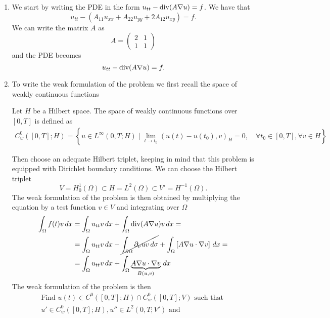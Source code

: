 \begin{enumerate}
    \item We start by writing the PDE in the form \(u_{tt} - \text{div}(A \nabla u) = f\). We have that
    \[
        u_{tt} - \left(A_{11} u_{xx} + A_{22} u_{yy} + 2A_{12} u_{xy}\right) = f.
    \]
    We can write the matrix \(A\) as
    \[
        A = \begin{pmatrix}
            2 & 1 \\
            1 & 1
        \end{pmatrix}
    \]
    and the PDE becomes
    \[
        u_{tt} - \text{div} (A \nabla u) = f.
    \]
    \item To write the weak formulation of the problem we first recall the space of weakly continuous functions
    \begin{remark}
        Let \(H\) be a Hilbert space. The space of weakly continuous functions over \([0, T]\) is defined as
        \[
            \begin{split}
                C_w^0([0, T]; H) = \left\{ u \in L^\infty(0, T; H) \mid \lim_{t \to t_0} (u(t) - u(t_0), v)_H = 0, \quad \forall t_0 \in [0, T], \forall v \in H \right\}
            \end{split}
        \] 
    \end{remark}
    Then choose an adequate Hilbert triplet, keeping in mind that this problem is equipped with Dirichlet boundary conditions. We can choose the Hilbert triplet
    \[
        V = H^1_0(\Omega) \subset H = L^2(\Omega) \subset V' = H^{-1}(\Omega).
    \]
    The weak formulation of the problem is then obtained by multiplying the equation by a test function \(v \in V\) and integrating over \(\Omega\)
    \begin{align*}
        \int_\Omega f(t) v \, dx &= \int_\Omega u_{tt} v \, dx + \int_\Omega \text{div}(A \nabla u)v \, dx =\\
        &= \int_\Omega u_{tt} v \, dx - \cancel{\int_{\partial\Omega} \partial_\nu u v \, d\sigma} + \int_\Omega \left[A \nabla u \cdot \nabla v\right] \, dx = \\
        &= \int_\Omega u_{tt} v \, dx + \int_\Omega \underbrace{A \nabla u \cdot \nabla v}_{B(u, v)} \, dx
    \end{align*}
    The weak formulation of the problem is then
    \[
        \begin{split}
            \text{Find } u(t) \in C^0([0, T]; H) \cap C_w^0([0, T]; V) \text{ such that } \\
            u' \in C_w^0([0, T]; H), u'' \in L^2(0, T; V') \text{ and } \\

\end{split}\]
\end{enumerate}

